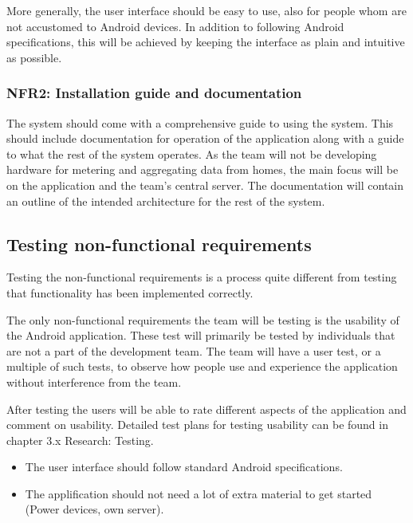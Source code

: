 More generally, the user interface should be easy to use, also for people whom are not accustomed to Android devices. In 
addition to following Android specifications, this will be achieved by keeping the interface as plain and intuitive as possible.

\subsubsection{NFR2: Installation guide and documentation}
The system should come with a comprehensive guide to using the system. This should include documentation for operation of the
application along with a guide to what the rest of the system operates. As the team will not be developing hardware for metering and 
aggregating data from homes, the main focus will be on the application and the team's central server. The documentation will contain an outline 
of the intended architecture for the rest of the system.

\subsection{Testing non-functional requirements}
Testing the non-functional requirements is a process quite different from testing that functionality has been implemented correctly.

The only non-functional requirements the team will be testing is the usability of the Android application. These test will primarily be 
tested by individuals that are not a part of the development team. The team will have a user test, or a multiple of such tests, to observe how people use and experience the application without interference from the team. 

After testing the users will be able to rate different aspects of the application and comment on usability. Detailed 
test plans for testing usability can be found in chapter 3.x Research: Testing.

\begin{itemize}
\item The user interface should follow standard Android specifications. 
\item The applification should not need a lot of extra material to get started (Power devices, own server).
\end{itemize}